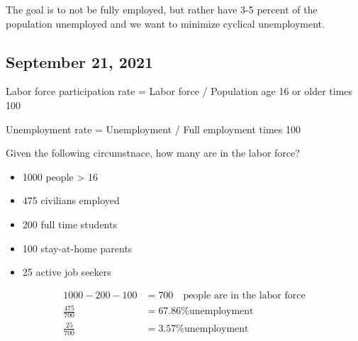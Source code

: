 \documentclass{scrreprt} %
\begin{document}
\begin{remark}
	The goal is to not be fully employed, but rather have 3-5 percent of the population
	unemployed and we want to minimize cyclical unemployment.
\end{remark}

\subsection{September 21, 2021}

\begin{definition}
	Labor force participation rate = Labor force / Population age 16 or older times 100

	Unemployment rate = Unemployment / Full employment times 100
\end{definition}

\begin{example}
	Given the following circumstnace, how many are in the labor force?

	\begin{itemize}
		\item 1000 people > 16
		\item 475 civilians employed
		\item 200 full time students
		\item 100 stay-at-home parents
		\item 25 active job seekers
	\end{itemize}

	\begin{align*}
		1000 - 200 - 100 &= 700 \quad \text{people are in the labor force} \\
		\frac{475}{700} &= 67.86 \text{\% unemployment} \\
		\frac{25}{700} &= 3.57 \text{\% unemployment}
	\end{align*}
\end{example}
\end{document}
